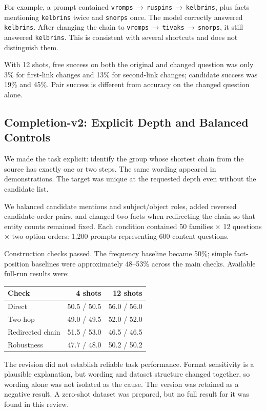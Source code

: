 \documentclass[11pt,a4paper]{article}
\begin{document}
For example, a prompt contained \texttt{vromps}\,$\rightarrow$\,\texttt{ruspins}\,$\rightarrow$\,\texttt{kelbrins}, plus facts mentioning \texttt{kelbrins} twice and \texttt{snorps} once. The model correctly answered \texttt{kelbrins}. After changing the chain to \texttt{vromps}\,$\rightarrow$\,\texttt{tivaks}\,$\rightarrow$\,\texttt{snorps}, it still answered \texttt{kelbrins}. This is consistent with several shortcuts and does not distinguish them.

With 12 shots, free success on both the original and changed question was only 3\% for first-link changes and 13\% for second-link changes; candidate success was 19\% and 45\%. Pair success is different from accuracy on the changed question alone.

\subsection{Completion-v2: Explicit Depth and Balanced Controls}
We made the task explicit: identify the group whose shortest chain from the source has exactly one or two steps. The same wording appeared in demonstrations. The target was unique at the requested depth even without the candidate list.

We balanced candidate mentions and subject/object roles, added reversed candidate-order pairs, and changed two facts when redirecting the chain so that entity counts remained fixed. Each condition contained 50 families $\times$ 12 questions $\times$ two option orders: 1,200 prompts representing 600 content questions.

Construction checks passed. The frequency baseline became 50\%; simple fact-position baselines were approximately 48--53\% across the main checks. Available full-run results were:
\begin{center}\small
\begin{tabular}{lrr}
\toprule
Check & 4 shots & 12 shots\\\midrule
Direct & 50.5 / 50.5 & 56.0 / 56.0\\
Two-hop & 49.0 / 49.5 & 52.0 / 52.0\\
Redirected chain & 51.5 / 53.0 & 46.5 / 46.5\\
Robustness & 47.7 / 48.0 & 50.2 / 50.2\\\bottomrule
\end{tabular}
\end{center}
The revision did not establish reliable task performance. Format sensitivity is a plausible explanation, but wording and dataset structure changed together, so wording alone was not isolated as the cause. The version was retained as a negative result. A zero-shot dataset was prepared, but no full result for it was found in this review.
\end{document}

